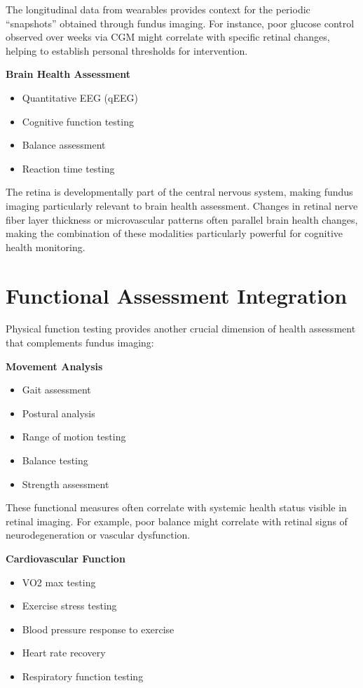 \documentclass[
  Letterpaper,
]{scrbook}
\providecommand{\tightlist}{%
  \setlength{\itemsep}{0pt}\setlength{\parskip}{0pt}}\usepackage{longtable,booktabs,array}
\begin{document}
The longitudinal data from wearables provides context for the periodic
``snapshots'' obtained through fundus imaging. For instance, poor
glucose control observed over weeks via CGM might correlate with
specific retinal changes, helping to establish personal thresholds for
intervention.

\textbf{Brain Health Assessment}

\begin{itemize}
\tightlist
\item
  Quantitative EEG (qEEG)
\item
  Cognitive function testing
\item
  Balance assessment
\item
  Reaction time testing
\end{itemize}

The retina is developmentally part of the central nervous system, making
fundus imaging particularly relevant to brain health assessment. Changes
in retinal nerve fiber layer thickness or microvascular patterns often
parallel brain health changes, making the combination of these
modalities particularly powerful for cognitive health monitoring.

\section{Functional Assessment
Integration}\label{functional-assessment-integration}

Physical function testing provides another crucial dimension of health
assessment that complements fundus imaging:

\textbf{Movement Analysis}

\begin{itemize}
\tightlist
\item
  Gait assessment
\item
  Postural analysis
\item
  Range of motion testing
\item
  Balance testing
\item
  Strength assessment
\end{itemize}

These functional measures often correlate with systemic health status
visible in retinal imaging. For example, poor balance might correlate
with retinal signs of neurodegeneration or vascular dysfunction.

\textbf{Cardiovascular Function}

\begin{itemize}
\tightlist
\item
  VO2 max testing
\item
  Exercise stress testing
\item
  Blood pressure response to exercise
\item
  Heart rate recovery
\item
  Respiratory function testing
\end{itemize}
\end{document}

